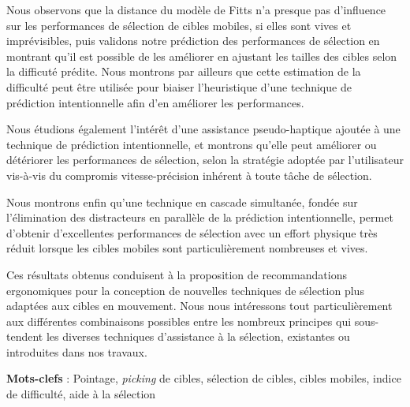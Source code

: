 	Nous observons que la distance du modèle de Fitts n'a presque pas d'influence sur les performances de sélection de cibles mobiles, si elles sont vives et imprévisibles, puis validons notre prédiction des performances de sélection en montrant qu'il est possible de les améliorer en ajustant les tailles des cibles selon la difficuté prédite. Nous montrons par ailleurs que cette estimation de la difficulté peut être utilisée pour biaiser l'heuristique d'une technique de prédiction intentionnelle afin d'en améliorer les performances.
	
	Nous étudions également l'intérêt d'une assistance pseudo-haptique ajoutée à une technique de prédiction intentionnelle, et montrons qu'elle peut améliorer ou détériorer les performances de sélection, selon la stratégie adoptée par l'utilisateur vis-à-vis du compromis vitesse-précision inhérent à toute tâche de sélection.
	
	Nous montrons enfin qu'une technique en \og cascade \fg{} simultanée, fondée sur l'élimination des distracteurs en parallèle de la prédiction intentionnelle, permet d'obtenir d'excellentes performances de sélection avec un effort physique très réduit lorsque les cibles mobiles sont particulièrement nombreuses et vives.
	
	Ces résultats obtenus conduisent à la proposition de recommandations ergonomiques pour la conception de nouvelles techniques de sélection plus adaptées aux cibles en mouvement. Nous nous intéressons tout particulièrement aux différentes combinaisons possibles entre les nombreux principes qui sous-tendent les diverses techniques d'assistance à la sélection, existantes ou introduites dans nos travaux.
 
\textbf{Mots-clefs} : Pointage, \emph{picking} de cibles, sélection de cibles, cibles mobiles, indice de difficulté, aide à la sélection